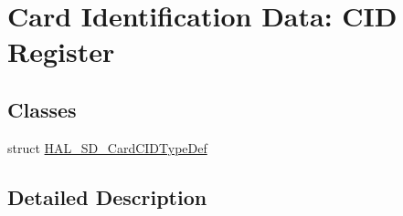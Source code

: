 \hypertarget{group___s_d___exported___types___group5}{}\section{Card Identification Data\+: C\+ID Register}
\label{group___s_d___exported___types___group5}
\subsection*{Classes}
\begin{DoxyCompactItemize}
\item 
struct \mbox{\hyperlink{struct_h_a_l___s_d___card_c_i_d_type_def}{H\+A\+L\+\_\+\+S\+D\+\_\+\+Card\+C\+I\+D\+Type\+Def}}
\end{DoxyCompactItemize}


\subsection{Detailed Description}
